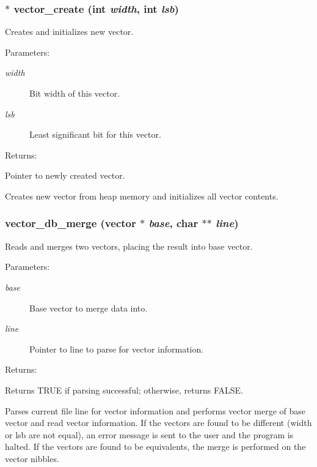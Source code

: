 \subsubsection{$\ast$ vector\_\-create (int {\em width}, int {\em lsb})}\label{vector_8c_a8}


Creates and initializes new vector.

\begin{Desc}
\item[Parameters: ]\par
\begin{description}
\item[{\em 
width}]Bit width of this vector. \item[{\em 
lsb}]Least significant bit for this vector. \end{description}
\end{Desc}
\begin{Desc}
\item[Returns: ]\par
Pointer to newly created vector.\end{Desc}
Creates new vector from heap memory and initializes all vector contents. 
\subsubsection{ vector\_\-db\_\-merge ({\bf vector} $\ast$ {\em base}, char $\ast$$\ast$ {\em line})}\label{vector_8c_a11}


Reads and merges two vectors, placing the result into base vector.

\begin{Desc}
\item[Parameters: ]\par
\begin{description}
\item[{\em 
base}]Base vector to merge data into. \item[{\em 
line}]Pointer to line to parse for vector information.\end{description}
\end{Desc}
\begin{Desc}
\item[Returns: ]\par
Returns TRUE if parsing successful; otherwise, returns FALSE.\end{Desc}
Parses current file line for vector information and performs vector merge of  base vector and read vector information. If the vectors are found to be different (width or lsb are not equal), an error message is sent to the user and the program is halted. If the vectors are found to be equivalents, the merge is performed on the vector nibbles. 
